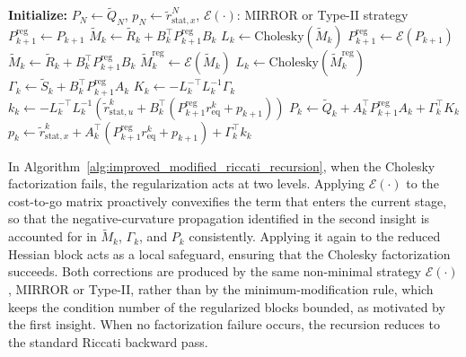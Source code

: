 \documentclass[class=scrbook, crop=false]{standalone}
\begin{document}
\begin{algorithm}[H]
\caption{Backward Pass of Improved Modified Riccati Recursion}
\label{alg:improved_modified_riccati_recursion}
\begin{algorithmic}[1]
\State\textbf{Initialize:} $P_N \gets \tilde{Q}_N$, $p_N \gets \tilde{r}_{\mathrm{stat}, x}^N$, $\mathcal{E}(\cdot)$: MIRROR or Type-II strategy
\Statex 
{}
    \State $P_{k+1}^\mathrm{reg} \gets P_{k+1}$ 
    \State $\tilde{M}_k \gets \tilde{R}_k + B_k^\top P_{k+1}^\mathrm{reg} B_k$
    \State $L_k \gets \mathrm{Cholesky}(\tilde{M}_k)$
        \State $P_{k+1}^\mathrm{reg} \gets \mathcal{E}(P_{k+1})$ 
        \State $\tilde{M}_k \gets \tilde{R}_k + B_k^\top P_{k+1}^\mathrm{reg} B_k$
        \State $\tilde{M}_k^\mathrm{reg} \gets \mathcal{E}(\tilde{M}_k)$ 
        \State $L_k \gets \mathrm{Cholesky}(\tilde{M}_k^\mathrm{reg})$
    \EndIf
    \State $\Gamma_k \gets \tilde{S}_k + B_k^\top P_{k+1}^\mathrm{reg} A_k$
    \Statex
    \State $K_k \gets -L_k^{-\top} L_k^{-1} \Gamma_k$
    \State $k_k \gets -L_k^{-\top} L_k^{-1} \left(\tilde{r}_{\mathrm{stat}, u}^k + B_k^\top (P_{k+1}^\mathrm{reg} r_{\mathrm{eq}}^k + p_{k+1})\right)$
    \Statex
    \State $P_k \gets \tilde{Q}_k + A_k^\top P_{k+1}^\mathrm{reg} A_k + \Gamma_k^\top K_k$
    \State $p_k \gets \tilde{r}_{\mathrm{stat}, x}^k + A_k^\top (P_{k+1}^\mathrm{reg} r_{\mathrm{eq}}^k + p_{k+1}) + \Gamma_k^\top k_k$
\EndFor
\end{algorithmic}
\end{algorithm}

In Algorithm~\ref{alg:improved_modified_riccati_recursion}, when the Cholesky factorization fails, the regularization acts at two levels. 
Applying $\mathcal{E}(\cdot)$ to the cost-to-go matrix proactively convexifies the term that enters the current stage, 
so that the negative-curvature propagation identified in the second insight is accounted for in $\tilde{M}_k$, $\Gamma_k$, and $P_k$ consistently. 
Applying it again to the reduced Hessian block acts as a local safeguard, ensuring that the Cholesky factorization succeeds.
Both corrections are produced by the same non-minimal strategy $\mathcal{E}(\cdot)$, MIRROR or Type-II, rather than by the minimum-modification rule, 
which keeps the condition number of the regularized blocks bounded, as motivated by the first insight. 
When no factorization failure occurs, the recursion reduces to the standard Riccati backward pass.
\end{document}
